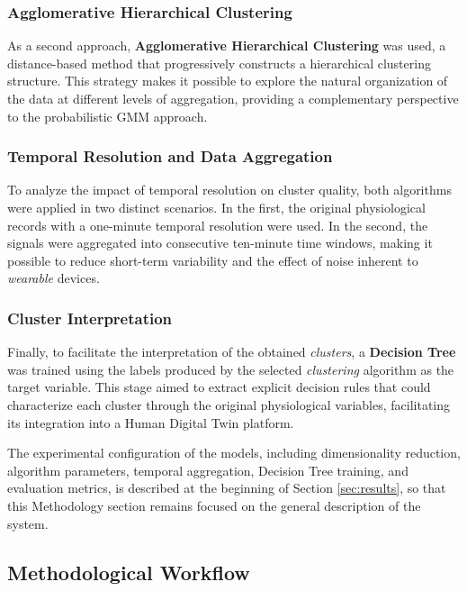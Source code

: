 \documentclass[a4paper,fleqn]{cas-sc}
\newcommand{\newtextorange}[1]{{\color{revorange}#1}}
\begin{document}
\subsubsection{Agglomerative Hierarchical Clustering}

As a second approach, \textbf{Agglomerative Hierarchical Clustering} was used, a distance-based method that progressively constructs a hierarchical clustering structure. This strategy makes it possible to explore the natural organization of the data at different levels of aggregation, providing a complementary perspective to the probabilistic GMM approach.

\subsubsection{Temporal Resolution and Data Aggregation}

To analyze the impact of temporal resolution on cluster quality, both algorithms were applied in two distinct scenarios. In the first, the original physiological records with a one-minute temporal resolution were used. In the second, the signals were aggregated into consecutive ten-minute time windows, making it possible to reduce short-term variability and the effect of noise inherent to \textit{wearable} devices.

\subsubsection{Cluster Interpretation}

Finally, to facilitate the interpretation of the obtained \textit{clusters}, a \textbf{Decision Tree} was trained using the labels produced by the selected \textit{clustering} algorithm as the target variable. This stage aimed to extract explicit decision rules that could characterize each cluster through the original physiological variables, facilitating its integration into a Human Digital Twin platform.

\medskip

\newtextorange{The experimental configuration of the models, including dimensionality reduction, algorithm parameters, temporal aggregation, Decision Tree training, and evaluation metrics, is described at the beginning of Section \ref{sec:results}, so that this Methodology section remains focused on the general description of the system.}

\subsection{Methodological Workflow}
\end{document}
